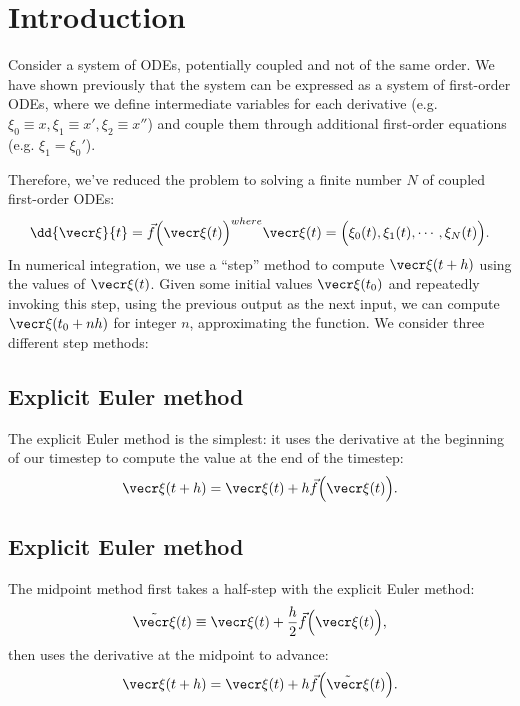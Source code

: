 \documentclass{article}
\begin{document}
\section{Introduction}

Consider a system of ODEs, potentially coupled and not of the same
order. We have shown previously that the system can be expressed as a
system of first-order ODEs, where we define intermediate variables
for each derivative (e.g. $\xi_0 \equiv x, \xi_1 \equiv x', \xi_2 \equiv
x''$) and couple them through additional first-order equations
(e.g. $\xi_1 = \xi_0'$).

Therefore, we've reduced
the problem to solving a finite number $N$ of coupled first-order ODEs:
\begin{align}
    \dd{\vecr\xi}{t} = \vec f\Big( \vecr\xi(t) \Big)
    \sp{where}
    \vecr\xi(t) = \Big(\xi_0(t), \xi_1(t), \cdots, \xi_N(t)\Big).
\end{align}
In numerical integration, we use a ``step'' method to compute
$\vecr\xi(t + h)$ using the values of $\vecr\xi(t)$. Given some initial
values $\vecr\xi(t_0)$ and repeatedly invoking this step, using the
previous output as the next input, we can compute $\vecr\xi(t_0 + nh)$
for integer $n$, approximating the function. We consider three different
step methods:

\subsection{Explicit Euler method}

The explicit Euler method is the simplest: it uses the derivative
at the beginning of our timestep to compute the value at the end of the
timestep:
\begin{align}
    \vecr\xi(t + h) = \vecr\xi(t) + h\vec f\Big(\vecr\xi(t)\Big).
\end{align}

\subsection{Explicit Euler method}

The midpoint method first takes a half-step with the explicit Euler method:
\begin{align}
    \tilde{\vecr\xi}(t) \equiv \vecr\xi(t) + {h \over 2} \vec f\Big(
    \vecr\xi(t)\Big),
\end{align}
then uses the derivative at the midpoint to advance:
\begin{align}
    \vecr\xi(t + h) = \vecr\xi(t) + h\vec f\Big(\tilde{\vecr\xi}(t)\Big).
\end{align}
\end{document}
